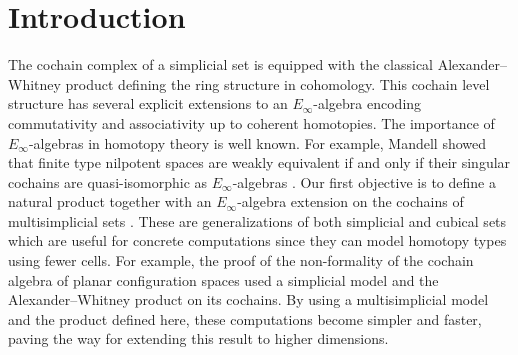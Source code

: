
\section{Introduction}\label{s:introduction}

The cochain complex of a simplicial set is equipped with the classical Alexander--Whitney product defining the ring structure in cohomology.
This cochain level structure has several explicit extensions to an $E_\infty$-algebra \cite{mcclure2003multivariable, berger2004combinatorial, medina2020prop1} encoding commutativity and associativity up to coherent homotopies.
The importance of $E_\infty$-algebras in homotopy theory is well known.
For example, Mandell showed that finite type nilpotent spaces are weakly equivalent if and only if their singular cochains are quasi-isomorphic as $E_\infty$-algebras \cite{mandell2006homotopy_type}.
Our first objective is to define a natural product together with an $E_\infty$-algebra extension on the cochains of multisimplicial sets \cite{gugenheim1957supercomplexes}.
These are generalizations of both simplicial and cubical sets which are useful for concrete computations since they can model homotopy types using fewer cells.
For example, the proof of the non-formality of the cochain algebra of planar configuration spaces \cite{salvatore2020planarnonformality} used a simplicial model and the Alexander--Whitney product on its cochains.
By using a multisimplicial model and the product defined here, these computations become simpler and faster, paving the way for extending this result to higher dimensions.

